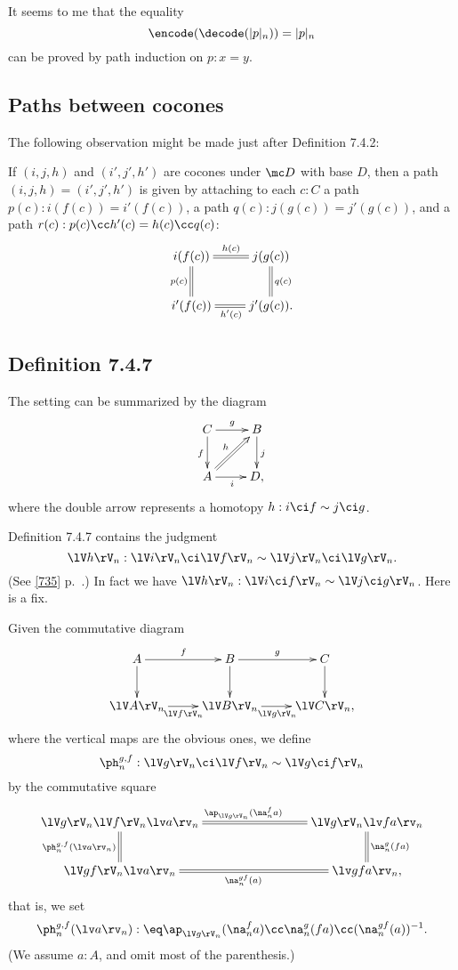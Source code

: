 \documentclass[12pt]{article}
\begin{document}
It seems to me that the equality 
$$
\encode(\decode(\lvert p\rvert_n))=\lvert p\rvert_n
$$ 
can be proved by path induction on $p:x=y$.


\subsection{Paths between cocones}\label{742}

The following observation might be made just after Definition 7.4.2: 

If $(i,j,h)$ and $(i',j',h')$ are cocones under $\mc D$ with base $D$, then a path $(i,j,h)=(i',j',h')$ is given by attaching to each $c:C$ a path $p(c):i(f(c))=i'(f(c))$, a path $q(c):j(g(c))=j'(g(c))$, and a path $r(c):p(c)\cc h'(c)=h(c)\cc q(c)$: 
$$
\xymatrix{
i(f(c))\ar@{=}[r]^{h(c)}\ar@{=}[d]_{p(c)}&j(g(c))\ar@{=}[d]^{q(c)}\\ 
i'(f(c))\ar@{=}[r]_{h'(c)}&j'(g(c)).}
$$


\subsection{Definition 7.4.7}\label{747}

The setting can be summarized by the diagram 
$$
\xymatrix{C\ar[r]^g\ar[d]_f&B\ar[d]^j\\ A\ar[r]_i\ar@{=>}[ur]^h&D,}
$$ 
where the double arrow represents a homotopy $h:i\ci f\sim j\ci g$.

Definition 7.4.7 contains the judgment 
$$
\lV h\rV_n:\lV i\rV_n\ci\lV f\rV_n\sim\lV j\rV_n\ci\lV g\rV_n.
$$ 
(See \eqref{735} p.~\pageref{735}.) In fact we have $\lV h\rV_n:\lV i\ci f\rV_n\sim\lV j\ci g\rV_n$. Here is a fix. 

Given the commutative diagram
$$
\xymatrix{
A\ar[r]^f\ar[d]&B\ar[r]^g\ar[d]&C\ar[d]\\
\lV A\rV_n\ar[r]_{\lV f\rV_n}&\lV B\rV_n\ar[r]_{\lV g\rV_n}&\lV C\rV_n,}
$$ 
where the vertical maps are the obvious ones, we define 
$$
\ph_n^{g,f}:\lV g\rV_n\ci\lV f\rV_n\sim\lV g\ci f\rV_n
$$ 
by the commutative square 
$$
\xymatrix{
\lV g\rV_n\lV f\rV_n\lv a\rv_n\ar@{=}[d]_{\ph_n^{g,f}(\lv a\rv_n)}\ar@{=}[rrr]^{\ap_{\lV g\rV_n}(\na_n^fa)}&&&
\lV g\rV_n\lv fa\rv_n\ar@{=}[d]^{\na_n^g(fa)}\\
\lV gf\rV_n\lv a\rv_n\ar@{=}[rrr]_{\na_n^{gf}(a)}&&&\lv gfa\rv_n,}
$$ 
that is, we set 
$$
\ph_n^{g,f}(\lv a\rv_n):\eq\ap_{\lV g\rV_n}(\na_n^fa)\cc\na_n^g(fa)\cc(\na_n^{gf}(a))^{-1}.
$$ 
(We assume $a:A$, and omit most of the parenthesis.)
\end{document}
